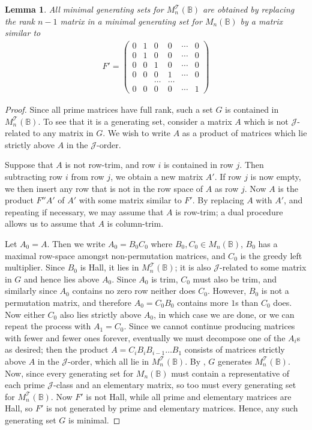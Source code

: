\documentclass[11pt]{article}
\newtheorem{lemma}[thm]{Lemma}
\numberwithin{equation}{section}
\newcommand{\B}{\mathbb{B}}
\newcommand{\Bn}{M_n(\B)}
\newcommand{\MTn}{M_n^{\mathcal{T}}(\B)}
\newcommand{\J}{\mathscr{J}}
\begin{document}
\begin{lemma}
  All minimal generating sets for $\MTn$ are obtained by replacing the rank $n -
  1$ matrix in a minimal generating set for $\Bn$ by a matrix similar to
  \begin{align*}
    F' = \begin{pmatrix}
      0 & 1 & 0 & 0 & \cdots & 0 \\
      0 & 1 & 0 & 0 & \cdots & 0 \\
      0 & 0 & 1 & 0 & \cdots & 0 \\
      0 & 0 & 0 & 1 & \cdots & 0 \\
        &   &   \dots & \dots & \\
      0 & 0 & 0 & 0 & \cdots & 1
    \end{pmatrix}
  \end{align*}
\end{lemma}
\begin{proof}
  Since all prime matrices have full rank, such a set $G$ is contained in
  $\MTn$. To see that it is a generating set, consider a matrix $A$ which is not
  $\J$-related to any matrix in $G$. We wish to write $A$ as a product of
  matrices which lie strictly above $A$ in the $\J$-order. 
  
  Suppose that $A$ is not row-trim, and row $i$ is contained in row $j$. Then
  subtracting row $i$ from row $j$, we obtain a new matrix $A'$. If row $j$ is
  now empty, we then insert any row that is not in the row space of $A$ as row
  $j$. Now $A$ is the product $F''A'$ of $A'$ with some matrix similar to $F'$. By
  replacing $A$ with $A'$, and repeating if necessary, we may assume that $A$ is
  row-trim; a dual procedure allows us to assume that $A$ is column-trim. 
  
  Let $A_0 = A$. Then we write $A_0 = B_0C_0$ where $B_0, C_0 \in \Bn$, $B_0$ has a
  maximal row-space amongst non-permutation matrices, and $C_0$ is the greedy left
  multiplier. Since $B_0$ is Hall, it lies in $\MTn$; it is also $\J$-related to
  some matrix in $G$ and hence lies above $A_0$. Since $A_0$ is trim, $C_0$ must also
  be trim, and similarly since $A_0$ contains no zero row neither does $C_0$.
  However, $B_0$ is not a permutation matrix, and therefore $A_0 = C_0B_0$ contains more
  $1$s than $C_0$ does. Now either $C_0$ also lies strictly above $A_0$, in which case
  we are done, or we can repeat the process with $A_1 = C_0$. Since we
  cannot continue producing matrices with fewer and fewer ones forever,
  eventually we must decompose one of the $A_i$s as desired; then the product $A
  = C_i B_i B_{i - 1} \ldots B_1$ consists of matrices strictly above $A$ in the
  $\J$-order, which all lie in $\MTn$. By ,
  $G$ generates $\MTn$.
  Now, since every generating set for $\Bn$ must contain a representative of
  each prime $\J$-class and an elementary matrix, so too must every generating
  set for $\MTn$. Now $F'$ is not Hall, while all prime and elementary matrices
  are Hall, so $F'$ is not generated by prime and elementary matrices. Hence,
  any such generating set $G$ is minimal.
\end{proof}
\end{document}
